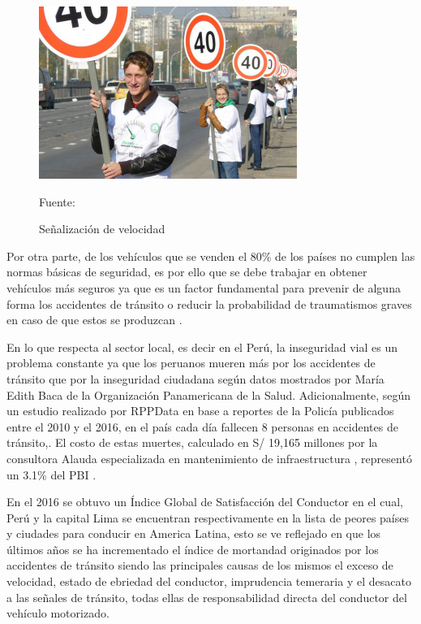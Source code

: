 	\vskip 0.15cm
	\begin{figure}[H]
	\begin{center}
	\includegraphics[width=0.75\textwidth]{images/intro/velocidad}
	\end{center}
	\begin{center}
	\caption{\small{Señalización de velocidad}}
	{\small{Fuente: \cite{OMS}}}
	\end{center}
	\vspace{-1.5em}
	\end{figure}
	
	Por otra parte, de los vehículos que se venden el 80\% de los países no cumplen las normas básicas de seguridad, es por ello que se debe trabajar en obtener vehículos más seguros ya que es un factor fundamental para prevenir de alguna forma los accidentes de tránsito o reducir la probabilidad de traumatismos graves en caso de que estos se produzcan \citep{OMS}.
	
	\vskip 0.15cm
	En lo que respecta al sector local, es decir en el Perú, la inseguridad vial es un problema constante ya que los peruanos mueren más por los accidentes de tránsito que por la inseguridad ciudadana según datos mostrados por María Edith Baca de la Organización Panamericana de la Salud\citep{OPS}. Adicionalmente, según un estudio realizado por RPPData en base a reportes de la Policía publicados entre el 2010 y el 2016, en el país cada día fallecen 8 personas en accidentes de tránsito,\citep{RPPData}. El costo de estas muertes, calculado en S/ 19,165 millones por la consultora Alauda especializada en mantenimiento de infraestructura , representó un 3.1\% del PBI \citep{Gestion2}.  
	
	
	\vskip 0.15cm
	En el 2016 se obtuvo un Índice Global de Satisfacción del Conductor \citep{CNN} en el cual, Perú y la capital Lima se encuentran respectivamente en la lista de peores países y ciudades para conducir en America Latina, esto se ve reflejado en que los últimos años se ha incrementado el índice de mortandad originados por los accidentes de tránsito siendo las principales causas de los mismos el exceso de velocidad, estado de ebriedad del conductor, imprudencia temeraria y el desacato a las señales de tránsito, todas ellas de responsabilidad directa del conductor del vehículo motorizado\citep{SUTRAN}. 
	
